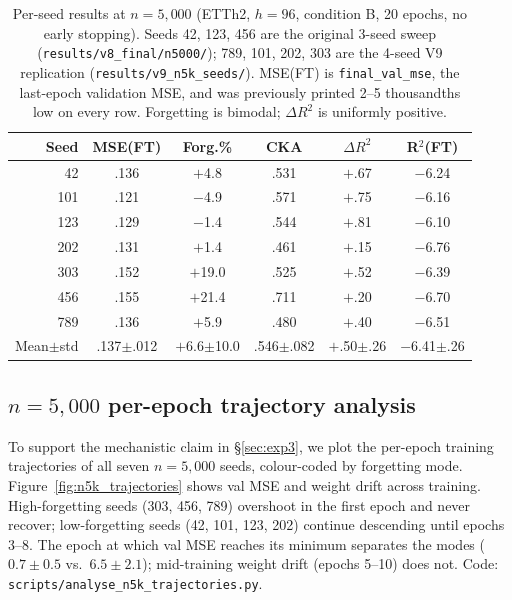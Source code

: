 \begin{table}[t]
\centering
\caption{Per-seed results at $n{=}5{,}000$ (ETTh2, $h{=}96$, condition B,
20 epochs, no early stopping).  Seeds 42, 123, 456 are the original 3-seed sweep
(\texttt{results/v8\_final/n5000/}); 789, 101, 202, 303 are the 4-seed V9
replication (\texttt{results/v9\_n5k\_seeds/}).  MSE(FT) is
\texttt{final\_val\_mse}, the last-epoch validation MSE, and was previously
printed 2--5 thousandths low on every row.  Forgetting is bimodal; $\Delta R^2$
is uniformly positive.}
\label{tab:n5k_seeds}
\small
\begin{tabular}{rccccc}
\toprule
Seed & MSE(FT) & Forg.\% & CKA & $\Delta R^2$ & R$^2$(FT) \\
\midrule
 42  & .136 & $+$4.8  & .531 & $+$.67 & $-$6.24 \\
101  & .121 & $-$4.9  & .571 & $+$.75 & $-$6.16 \\
123  & .129 & $-$1.4  & .544 & $+$.81 & $-$6.10 \\
202  & .131 & $+$1.4  & .461 & $+$.15 & $-$6.76 \\
303  & .152 & $+$19.0 & .525 & $+$.52 & $-$6.39 \\
456  & .155 & $+$21.4 & .711 & $+$.20 & $-$6.70 \\
789  & .136 & $+$5.9  & .480 & $+$.40 & $-$6.51 \\
\midrule
Mean$\pm$std & .137$\pm$.012 & $+$6.6$\pm$10.0 & .546$\pm$.082 & $+$.50$\pm$.26 & $-$6.41$\pm$.26 \\
\bottomrule
\end{tabular}
\end{table}

\subsection{$n{=}5{,}000$ per-epoch trajectory analysis}
\label{app:n5k_trajectories}

To support the mechanistic claim in \S\ref{sec:exp3}, we plot the
per-epoch training trajectories of all seven $n{=}5{,}000$ seeds,
colour-coded by forgetting mode.  Figure~\ref{fig:n5k_trajectories}
shows val MSE and weight drift across training.  High-forgetting seeds
(303, 456, 789) overshoot in the first epoch and never recover;
low-forgetting seeds (42, 101, 123, 202) continue descending until
epochs 3--8.  The epoch at which val MSE reaches its minimum separates
the modes ($0.7\pm0.5$ vs.\ $6.5\pm2.1$); mid-training weight drift
(epochs 5--10) does not.  Code: \texttt{scripts/analyse\_n5k\_trajectories.py}.

